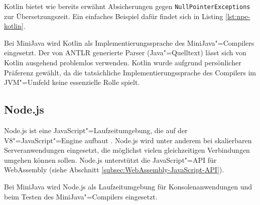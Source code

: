



Kotlin bietet wie bereits erwähnt Absicherungen gegen \lstinline{NullPointerExceptions} zur Übersetzungszeit. Ein einfaches Beispiel dafür findet sich in Listing \ref{lst:npe-kotlin}.



Bei MiniJava wird Kotlin als Implementierungssprache des MiniJava"=Compilers eingesetzt. Der von ANTLR generierte Parser (Java"=Quelltext) lässt sich von Kotlin ausgehend problemlos verwenden. Kotlin wurde aufgrund persönlicher Präferenz gewählt, da die tatsächliche Implementierungssprache des Compilers im JVM"=Umfeld keine essenzielle Rolle spielt.

\pagebreak
\subsection{Node.js}
Node.js ist eine JavaScript"=Laufzeitumgebung, die auf der V8"=JavaScript"=Engine aufbaut \cite{NodeJSDocumentation}. Node.js wird unter anderem bei skalierbaren Serveranwendungen eingesetzt, die möglichst vielen gleichzeitigen Verbindungen umgehen können sollen. Node.js unterstützt die JavaScript"=API für WebAssembly (siehe Abschnitt \ref{subsec:WebAssembly-JavaScript-API}).

Bei MiniJava wird Node.js als Laufzeitumgebung für Konsolenanwendungen und beim Testen des MiniJava"=Compilers eingesetzt.


